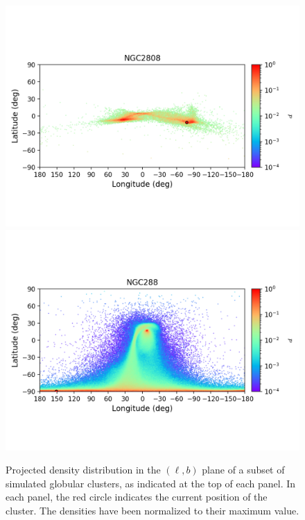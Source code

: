 \begin{figure}
\begin{center}
                \includegraphics[clip=true, trim = 0mm 20mm 0mm 10mm, width=1\columnwidth]{images/error_plots_NGC2808.png}
                \includegraphics[clip=true, trim = 0mm 20mm 0mm 10mm, width=1\columnwidth]{images/error_plots_NGC288.png}
            \end{center}
            \caption[]{Projected density distribution in the $(\ell, b)$ plane of a subset of simulated globular clusters, as indicated at the top of each panel. In each panel, the red circle indicates the current position of the cluster. The densities have been normalized to their maximum value.}\label{stream4}
        \end{figure}

